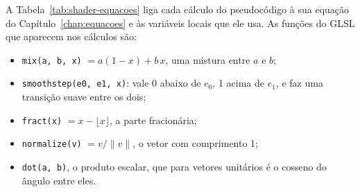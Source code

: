 A Tabela~\ref{tab:shader-equacoes} liga cada cálculo do pseudocódigo à sua equação do Capítulo~\ref{chap:equacoes} e às variáveis locais que ele usa. As funções do GLSL que aparecem nos cálculos são:
\begin{itemize}
    \item \texttt{mix(a, b, x)} \(= a(1-x)+b\,x\), uma mistura entre \(a\) e \(b\);
    \item \texttt{smoothstep(e0, e1, x)}: vale 0 abaixo de \(e_0\), 1 acima de \(e_1\), e faz uma transição suave entre os dois;
    \item \texttt{fract(x)} \(= x-\lfloor x\rfloor\), a parte fracionária;
    \item \texttt{normalize(v)} \(= v/\lVert v\rVert\), o vetor com comprimento 1;
    \item \texttt{dot(a, b)}, o produto escalar, que para vetores unitários é o cosseno do ângulo entre eles.
\end{itemize}

